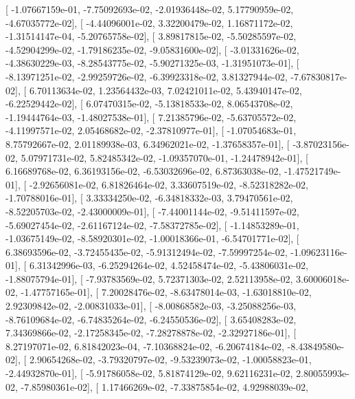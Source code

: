 \documentclass{article}
\begin{document}
       [ -1.07667159e-01,  -7.75092693e-02,  -2.01936448e-02,
          5.17790959e-02,  -4.67035772e-02],
       [ -4.44096001e-02,   3.32200479e-02,   1.16871172e-02,
         -1.31514147e-04,  -5.20765758e-02],
       [  3.89817815e-02,  -5.50285597e-02,  -4.52904299e-02,
         -1.79186235e-02,  -9.05831600e-02],
       [ -3.01331626e-02,  -4.38630229e-03,  -8.28543775e-02,
         -5.90271325e-03,  -1.31951073e-01],
       [ -8.13971251e-02,  -2.99259726e-02,  -6.39923318e-02,
          3.81327944e-02,  -7.67830817e-02],
       [  6.70113634e-02,   1.23564432e-03,   7.02421011e-02,
          5.43940147e-02,  -6.22529442e-02],
       [  6.07470315e-02,  -5.13818533e-02,   8.06543708e-02,
         -1.19444764e-03,  -1.48027538e-01],
       [  7.21385796e-02,  -5.63705572e-02,  -4.11997571e-02,
          2.05468682e-02,  -2.37810977e-01],
       [ -1.07054683e-01,   8.75792667e-02,   2.01189938e-03,
          6.34962021e-02,  -1.37658357e-01],
       [ -3.87023156e-02,   5.07971731e-02,   5.82485342e-02,
         -1.09357070e-01,  -1.24478942e-01],
       [  6.16689768e-02,   6.36193156e-02,  -6.53032696e-02,
          6.87363038e-02,  -1.47521749e-01],
       [ -2.92656081e-02,   6.81826464e-02,   3.33607519e-02,
         -8.52318282e-02,  -1.70788016e-01],
       [  3.33334250e-02,  -6.34818332e-03,   3.79470561e-02,
         -8.52205703e-02,  -2.43000009e-01],
       [ -7.44001144e-02,  -9.51411597e-02,  -5.69027454e-02,
         -2.61167124e-02,  -7.58372785e-02],
       [ -1.14853289e-01,  -1.03675149e-02,  -8.58920301e-02,
         -1.00018366e-01,  -6.54701771e-02],
       [  6.38693596e-02,  -3.72455435e-02,  -5.91312494e-02,
         -7.59997254e-02,  -1.09623116e-01],
       [  6.31342996e-03,  -6.25294264e-02,   4.52458474e-02,
         -5.43806031e-02,  -1.88075794e-01],
       [ -7.93783569e-02,   5.72371303e-02,   2.52113958e-02,
          3.60006018e-02,  -1.47757165e-01],
       [  7.20028476e-02,  -8.63478014e-03,  -1.63018810e-02,
          2.92309842e-02,  -2.00831033e-01],
       [ -8.00868582e-03,  -3.25088256e-03,  -8.76109684e-02,
         -6.74835264e-02,  -6.24550536e-02],
       [  3.65408283e-02,   7.34369866e-02,  -2.17258345e-02,
         -7.28278878e-02,  -2.32927186e-01],
       [  8.27197071e-02,   6.81842023e-04,  -7.10368824e-02,
         -6.20674184e-02,  -8.43849580e-02],
       [  2.90654268e-02,  -3.79320797e-02,  -9.53239073e-02,
         -1.00058823e-01,  -2.44932870e-01],
       [ -5.91786058e-02,   5.81874129e-02,   9.62116231e-02,
          2.80055993e-02,  -7.85980361e-02],
       [  1.17466269e-02,  -7.33875854e-02,   4.92988039e-02,
\end{document}
